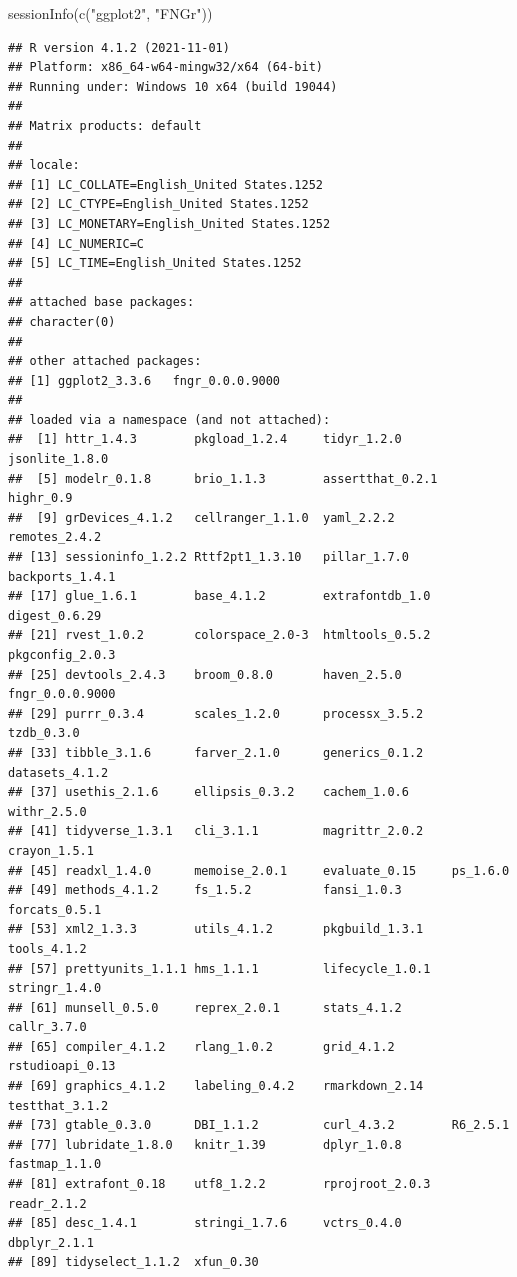 \documentclass[
]{article}
\newenvironment{Shaded}{\begin{snugshade}}{\end{snugshade}}
\newcommand{\FunctionTok}[1]{\textcolor[rgb]{0.00,0.00,0.00}{#1}}
\newcommand{\NormalTok}[1]{#1}
\newcommand{\StringTok}[1]{\textcolor[rgb]{0.31,0.60,0.02}{#1}}
\begin{document}
\begin{Shaded}
\begin{Highlighting}[]
\FunctionTok{sessionInfo}\NormalTok{(}\FunctionTok{c}\NormalTok{(}\StringTok{"ggplot2"}\NormalTok{, }\StringTok{"FNGr"}\NormalTok{))}
\end{Highlighting}
\end{Shaded}

\begin{verbatim}
## R version 4.1.2 (2021-11-01)
## Platform: x86_64-w64-mingw32/x64 (64-bit)
## Running under: Windows 10 x64 (build 19044)
## 
## Matrix products: default
## 
## locale:
## [1] LC_COLLATE=English_United States.1252 
## [2] LC_CTYPE=English_United States.1252   
## [3] LC_MONETARY=English_United States.1252
## [4] LC_NUMERIC=C                          
## [5] LC_TIME=English_United States.1252    
## 
## attached base packages:
## character(0)
## 
## other attached packages:
## [1] ggplot2_3.3.6   fngr_0.0.0.9000
## 
## loaded via a namespace (and not attached):
##  [1] httr_1.4.3        pkgload_1.2.4     tidyr_1.2.0       jsonlite_1.8.0   
##  [5] modelr_0.1.8      brio_1.1.3        assertthat_0.2.1  highr_0.9        
##  [9] grDevices_4.1.2   cellranger_1.1.0  yaml_2.2.2        remotes_2.4.2    
## [13] sessioninfo_1.2.2 Rttf2pt1_1.3.10   pillar_1.7.0      backports_1.4.1  
## [17] glue_1.6.1        base_4.1.2        extrafontdb_1.0   digest_0.6.29    
## [21] rvest_1.0.2       colorspace_2.0-3  htmltools_0.5.2   pkgconfig_2.0.3  
## [25] devtools_2.4.3    broom_0.8.0       haven_2.5.0       fngr_0.0.0.9000  
## [29] purrr_0.3.4       scales_1.2.0      processx_3.5.2    tzdb_0.3.0       
## [33] tibble_3.1.6      farver_2.1.0      generics_0.1.2    datasets_4.1.2   
## [37] usethis_2.1.6     ellipsis_0.3.2    cachem_1.0.6      withr_2.5.0      
## [41] tidyverse_1.3.1   cli_3.1.1         magrittr_2.0.2    crayon_1.5.1     
## [45] readxl_1.4.0      memoise_2.0.1     evaluate_0.15     ps_1.6.0         
## [49] methods_4.1.2     fs_1.5.2          fansi_1.0.3       forcats_0.5.1    
## [53] xml2_1.3.3        utils_4.1.2       pkgbuild_1.3.1    tools_4.1.2      
## [57] prettyunits_1.1.1 hms_1.1.1         lifecycle_1.0.1   stringr_1.4.0    
## [61] munsell_0.5.0     reprex_2.0.1      stats_4.1.2       callr_3.7.0      
## [65] compiler_4.1.2    rlang_1.0.2       grid_4.1.2        rstudioapi_0.13  
## [69] graphics_4.1.2    labeling_0.4.2    rmarkdown_2.14    testthat_3.1.2   
## [73] gtable_0.3.0      DBI_1.1.2         curl_4.3.2        R6_2.5.1         
## [77] lubridate_1.8.0   knitr_1.39        dplyr_1.0.8       fastmap_1.1.0    
## [81] extrafont_0.18    utf8_1.2.2        rprojroot_2.0.3   readr_2.1.2      
## [85] desc_1.4.1        stringi_1.7.6     vctrs_0.4.0       dbplyr_2.1.1     
## [89] tidyselect_1.1.2  xfun_0.30
\end{verbatim}
\end{document}

